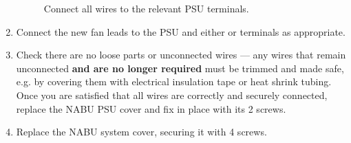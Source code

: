 \begin{enumerate}
\begin{figure}[h!]
		\caption[Motherboard to PSU wiring.]{Connect all wires to the relevant PSU terminals.}
		\label{fig:terminals}
	\end{figure}
	\item Connect the new fan leads to the PSU  and either  or  terminals as appropriate.
	\item Check there are no loose parts or unconnected wires --- any wires that remain unconnected \textbf{and are no longer required} must be trimmed and made safe, e.g. by covering them with electrical insulation tape or heat shrink tubing. Once you are satisfied that all wires are correctly and securely connected, replace the NABU PSU cover and fix in place with its 2 screws.
	\item Replace the NABU system cover, securing it with 4 screws.
\end{enumerate}
